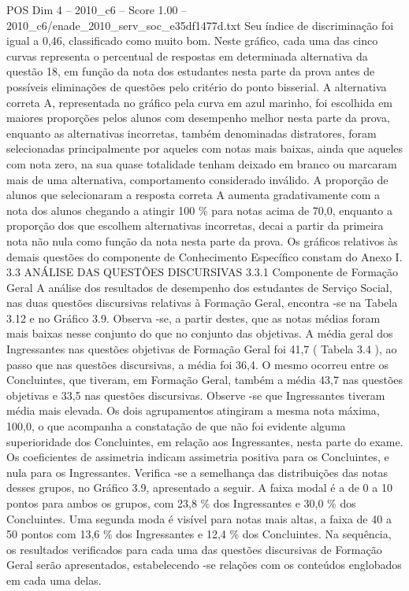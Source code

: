 \begin{textsample}{POS Dim 4 – 2010\_c6 – Score 1.00 – 2010\_c6/enade\_2010\_serv\_soc\_e35df1477d.txt}
Seu índice de discriminação foi igual a 0,46, classificado como muito bom.
Neste gráfico, cada uma das cinco curvas representa o percentual de respostas em determinada alternativa da questão 18, em função da nota dos estudantes nesta parte da prova antes de possíveis eliminações de questões pelo critério do ponto bisserial.
A alternativa correta A, representada no gráfico pela curva em azul marinho, foi escolhida em maiores proporções pelos alunos com desempenho melhor nesta parte da prova, enquanto as alternativas incorretas, também denominadas distratores, foram selecionadas principalmente por aqueles com notas mais baixas, ainda que aqueles com nota zero, na sua quase totalidade tenham deixado em branco ou marcaram mais de uma alternativa, comportamento considerado inválido.
A proporção de alunos que selecionaram a resposta correta A aumenta gradativamente com a nota dos alunos chegando a atingir 100 \% para notas acima de 70,0, enquanto a proporção dos que escolhem alternativas incorretas, decai a partir da primeira nota não nula como função da nota nesta parte da prova.
Os gráficos relativos às demais questões do componente de Conhecimento Específico constam do Anexo I. 3.3 ANÁLISE DAS QUESTÕES DISCURSIVAS 3.3.1 Componente de Formação Geral A análise dos resultados de desempenho dos estudantes de Serviço Social, nas duas questões discursivas relativas à Formação Geral, encontra -se na Tabela 3.12 e no Gráfico 3.9.
Observa -se, a partir destes, que as notas médias foram mais baixas nesse conjunto do que no conjunto das objetivas.
A média geral dos Ingressantes nas questões objetivas de Formação Geral foi 41,7 ( Tabela 3.4 ), ao passo que nas questões discursivas, a média foi 36,4.
O mesmo ocorreu entre os Concluintes, que tiveram, em Formação Geral, também a média 43,7 nas questões objetivas e 33,5 nas questões discursivas.
Observe -se que Ingressantes tiveram média mais elevada.
Os dois agrupamentos atingiram a mesma nota máxima, 100,0, o que acompanha a constatação de que não foi evidente alguma superioridade dos Concluintes, em relação aos Ingressantes, nesta parte do exame.
Os coeficientes de assimetria indicam assimetria positiva para os Concluintes, e nula para os Ingressantes.
Verifica -se a semelhança das distribuições das notas desses grupos, no Gráfico 3.9, apresentado a seguir.
A faixa modal é a de 0 a 10 pontos para ambos os grupos, com 23,8 \% dos Ingressantes e 30,0 \% dos Concluintes.
Uma segunda moda é visível para notas mais altas, a faixa de 40 a 50 pontos com 13,6 \% dos Ingressantes e 12,4 \% dos Concluintes.
Na sequência, os resultados verificados para cada uma das questões discursivas de Formação Geral serão apresentados, estabelecendo -se relações com os conteúdos englobados em cada uma delas.

\end{textsample}

